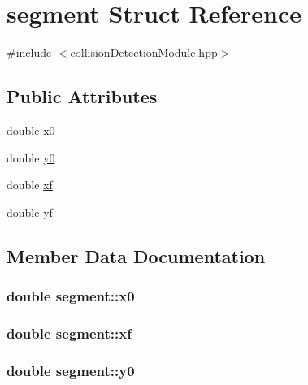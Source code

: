\hypertarget{structsegment}{}\section{segment Struct Reference}
\label{structsegment}


{\ttfamily \#include $<$collision\+Detection\+Module.\+hpp$>$}

\subsection*{Public Attributes}
\begin{DoxyCompactItemize}
\item 
double \hyperlink{structsegment_a30f47be5ba8f7e7a53c62ab500770994}{x0}
\item 
double \hyperlink{structsegment_aaffbc0c7387ac784927f71827658f6c7}{y0}
\item 
double \hyperlink{structsegment_adf5d6bb7837c117817932625421ad039}{xf}
\item 
double \hyperlink{structsegment_aa0e5d3d71e1593990e9d446d50b28468}{yf}
\end{DoxyCompactItemize}


\subsection{Member Data Documentation}
\subsubsection[{\texorpdfstring{x0}{x0}}]{\setlength{\rightskip}{0pt plus 5cm}double segment\+::x0}\hypertarget{structsegment_a30f47be5ba8f7e7a53c62ab500770994}{}\label{structsegment_a30f47be5ba8f7e7a53c62ab500770994}
\subsubsection[{\texorpdfstring{xf}{xf}}]{\setlength{\rightskip}{0pt plus 5cm}double segment\+::xf}\hypertarget{structsegment_adf5d6bb7837c117817932625421ad039}{}\label{structsegment_adf5d6bb7837c117817932625421ad039}
\subsubsection[{\texorpdfstring{y0}{y0}}]{\setlength{\rightskip}{0pt plus 5cm}double segment\+::y0}\hypertarget{structsegment_aaffbc0c7387ac784927f71827658f6c7}{}\label{structsegment_aaffbc0c7387ac784927f71827658f6c7}
